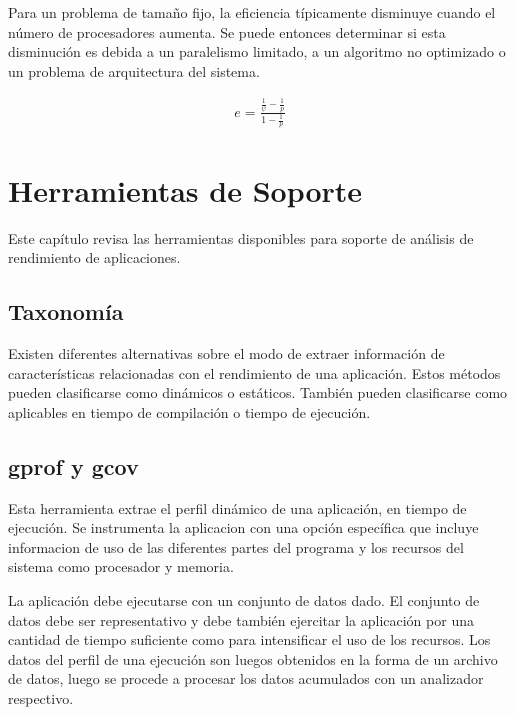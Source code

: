 \documentclass[a4paper]{report}
\begin{document}
Para un problema de tama\~no fijo, la eficiencia t\'ipicamente disminuye cuando
el n\'umero de procesadores aumenta. Se puede entonces determinar si esta disminuci\'on
es debida a un paralelismo limitado, a un algoritmo no optimizado o un problema de
arquitectura del sistema.

\begin{eqnarray}
\label{eq:karp-flatt}
 e = \frac{\frac{1}{\psi} - \frac{1}{p}}{1 - \frac{1}{p}} 
\end{eqnarray}

\chapter{Herramientas de Soporte}

Este cap\'itulo revisa las herramientas disponibles para soporte de an\'alisis
de rendimiento de aplicaciones.

\section{Taxonom\'ia}

Existen diferentes alternativas sobre el modo de extraer informaci\'on de
caracter\'isticas relacionadas con el rendimiento de una aplicaci\'on.
Estos m\'etodos pueden clasificarse como din\'amicos o est\'aticos.
Tambi\'en pueden clasificarse como aplicables en tiempo de compilaci\'on o
tiempo de ejecuci\'on.


\section{gprof y gcov}

Esta herramienta extrae el perfil din\'amico de una aplicaci\'on, en tiempo
de ejecuci\'on. Se instrumenta la aplicacion con una opci\'on espec\'ifica que
incluye informacion de uso de las diferentes partes del programa y los
recursos del sistema como procesador y memoria.

\bigskip

La aplicaci\'on debe ejecutarse con un conjunto de datos dado. El conjunto de
datos debe ser representativo y debe tambi\'en ejercitar la aplicaci\'on por
una cantidad de tiempo suficiente como para intensificar el uso de los
recursos. Los datos del perfil de una ejecuci\'on son luegos obtenidos en la
forma de un archivo de datos, luego se procede a procesar los datos acumulados
con un analizador respectivo.
\end{document}
